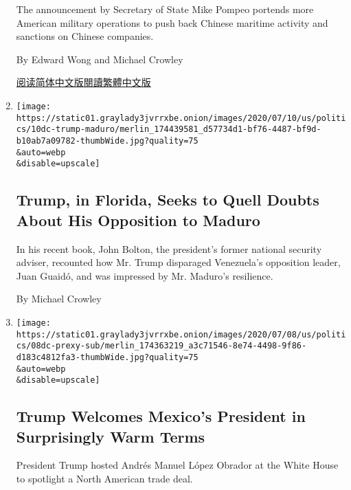\begin{enumerate}
  The announcement by Secretary of State Mike Pompeo portends more
  American military operations to push back Chinese maritime activity
  and sanctions on Chinese companies.

  By Edward Wong and Michael Crowley

  \href{https://cn.nytimes3xbfgragh.onion/asia-pacific/20200714/south-china-sea-pompeo/}{阅读简体中文版}\href{https://cn.nytimes3xbfgragh.onion/asia-pacific/20200714/south-china-sea-pompeo/zh-hant/}{閱讀繁體中文版}
\item
  \href{/2020/07/10/us/politics/trump-florida-maduro.html}{}

  \texttt{[image: https://static01.graylady3jvrrxbe.onion/images/2020/07/10/us/politics/10dc-trump-maduro/merlin\_174439581\_d57734d1-bf76-4487-bf9d-b10ab7a09782-thumbWide.jpg?quality=75\\\&auto=webp\\\&disable=upscale]}

  \hypertarget{trump-in-florida-seeks-to-quell-doubts-about-his-opposition-to-maduro}{%
  \subsection{Trump, in Florida, Seeks to Quell Doubts About His
  Opposition to
  Maduro}\label{trump-in-florida-seeks-to-quell-doubts-about-his-opposition-to-maduro}}

  In his recent book, John Bolton, the president's former national
  security adviser, recounted how Mr. Trump disparaged Venezuela's
  opposition leader, Juan Guaidó, and was impressed by Mr. Maduro's
  resilience.

  By Michael Crowley
\item
  \href{/2020/07/08/us/politics/trump-mexico-president-andres-manuel-lopez-obrador.html}{}

  \texttt{[image: https://static01.graylady3jvrrxbe.onion/images/2020/07/08/us/politics/08dc-prexy-sub/merlin\_174363219\_a3c71546-8e74-4498-9f86-d183c4812fa3-thumbWide.jpg?quality=75\\\&auto=webp\\\&disable=upscale]}

  \hypertarget{trump-welcomes-mexicos-president-in-surprisingly-warm-terms}{%
  \subsection{Trump Welcomes Mexico's President in Surprisingly Warm
  Terms}\label{trump-welcomes-mexicos-president-in-surprisingly-warm-terms}}

  President Trump hosted Andrés Manuel López Obrador at the White House
  to spotlight a North American trade deal.


\end{enumerate}

